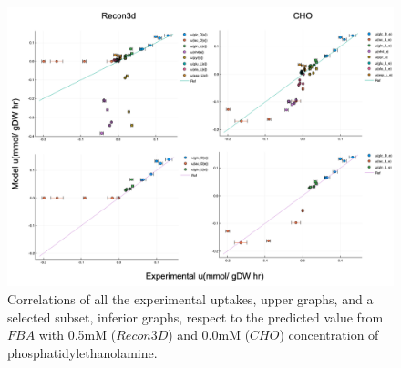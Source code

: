 	\begin{figure}[H]
		\includegraphics[scale = 0.5]{low_medium_2}
		\caption{Correlations of all the experimental uptakes, upper graphs, and a selected subset, inferior graphs, respect to the predicted value from $FBA$ with 0.5mM ($Recon3D$) and 0.0mM ($CHO$) concentration of phosphatidylethanolamine.}
		
	\end{figure}
